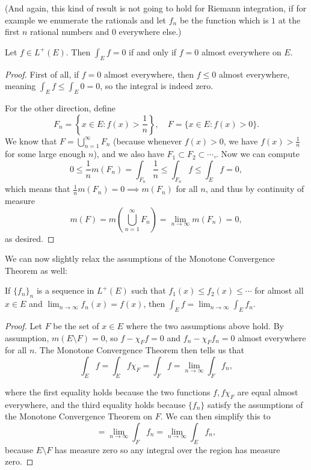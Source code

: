 (And again, this kind of result is not going to hold for Riemann integration, if for example we enumerate the rationals and let $f_n$ be the function which is $1$ at the first $n$ rational numbers and $0$ everywhere else.)

\begin{theorem}
Let $f \in L^+(E)$. Then $\int_E f = 0$ if and only if $f = 0$ almost everywhere on $E$.
\end{theorem}
\begin{proof}
First of all, if $f = 0$ almost everywhere, then $f \le 0$ almost everywhere, meaning $\int_E f \le \int_E 0 = 0$, so the integral is indeed zero. 


For the other direction, define 
\[
    F_n = \left\{x \in E: f(x) > \frac{1}{n}\right\}, \quad F = \{x \in E: f(x) > 0\}.
\]
We know that $F = \bigcup_{n=1}^{\infty} F_n$ (because whenever $f(x) > 0$, we have $f(x) > \frac{1}{n}$ for some large enough $n$), and we also have $F_1 \subset F_2 \subset \cdots$,. Now we can compute
\[
    0 \le \frac{1}{n} m (F_n) = \int_{F_n} \frac{1}{n} \le \int_{F_n} f \le \int_E f = 0,
\]
which means that $\frac{1}{n} m(F_n) = 0 \implies m(F_n)$ for all $n$, and thus by continuity of measure 
\[
    m(F) = m\left(\bigcup_{n=1}^{\infty} F_n\right) = \lim_{n \to \infty} m(F_n) = 0,
\]
as desired.
\end{proof}

We can now slightly relax the assumptions of the Monotone Convergence Theorem as well:

\begin{theorem}
If $\{f_n\}_n$ is a sequence in $L^+(E)$ such that $f_1(x) \le f_2(x) \le \cdots$ for almost all $x \in E$ and $\lim_{n \to \infty} f_n(x) = f(x)$, then $\int_E f = \lim_{n \to \infty} \int_E f_n$. 
\end{theorem}
\begin{proof}
Let $F$ be the set of $x \in E$ where the two assumptions above hold. By assumption, $m(E \setminus F) = 0$, so $f - \chi_F f = 0$ and $f_n - \chi_F f_n = 0$ almost everywhere for all $n$. The Monotone Convergence Theorem then tells us that 
\[
    \int_E f = \int_E f \chi_F = \int_F f = \lim_{n \to \infty} \int_F f_n,
\]


where the first equality holds because the two functions $f, f\chi_F$ are equal almost everywhere, and the third equality holds because $\{f_n\}$ satisfy the assumptions of the Monotone Convergence Theorem on $F$. We can then simplify this to 
\[
    = \lim_{n \to \infty} \int_F f_n = \lim_{n \to \infty} \int_E f_n,
\]
because $E \setminus F$ has measure zero so any integral over the region has measure zero.
\end{proof}


